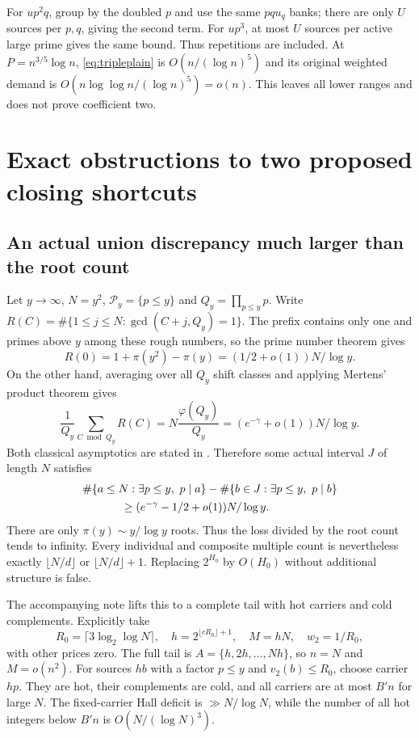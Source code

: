 \documentclass[11pt,a4paper]{article}
\begin{document}
For $up^2q$, group by the doubled $p$ and use the same $pqu_q$ banks;
there are only $U$ sources per $p,q$, giving the second term.
For $up^3$, at most $U$ sources per active large prime gives the same
bound. Thus repetitions are included. At $P=n^{3/5}\log n$,
\eqref{eq:tripleplain} is $O(n/(\log n)^5)$ and its original weighted
demand is $O(n\log\log n/(\log n)^5)=o(n)$.
This leaves all lower ranges and does not prove coefficient two.

\section{Exact obstructions to two proposed closing shortcuts}

\subsection{An actual union discrepancy much larger than the root count}
Let $y\to\infty$, $N=y^2$, $\mathcal P_y=\{p\le y\}$ and
$Q_y=\prod_{p\le y}p$. Write
$R(C)=\#\{1\le j\le N:\gcd(C+j,Q_y)=1\}$.
The prefix contains only one and primes above $y$ among these rough
numbers, so the prime number theorem gives
\[
 R(0)=1+\pi(y^2)-\pi(y)
      =(1/2+o(1))N/\log y.
\]
On the other hand, averaging over all $Q_y$ shift classes and applying
Mertens' product theorem gives
\[
 \frac1{Q_y}\sum_{C\bmod Q_y}R(C)
 =N\frac{\varphi(Q_y)}{Q_y}
 =(e^{-\gamma}+o(1))N/\log y.
\]
Both classical asymptotics are stated in \cite{Tao}. Therefore some
actual interval $J$ of length $N$ satisfies
\begin{equation}
 \begin{split}
 &\#\{a\le N:\exists p\le y,\ p\mid a\}
   -\#\{b\in J:\exists p\le y,\ p\mid b\}\\
 &\hspace{12mm}\ge(e^{-\gamma}-1/2+o(1))N/\log y.
 \end{split}                                                \label{eq:unioncounter}
\end{equation}
There are only $\pi(y)\sim y/\log y$ roots. Thus the loss divided
by the root count tends to infinity. Every individual and composite
multiple count is nevertheless exactly $\lfloor N/d\rfloor$ or
$\lfloor N/d\rfloor+1$. Replacing $2^{H_0}$ by $O(H_0)$ without
additional structure is false.

The accompanying note lifts this to a complete tail with hot carriers
and cold complements. Explicitly take
\[
 R_0=\lceil3\log_2\log N\rceil,\quad
 h=2^{\lfloor cR_0\rfloor+1},\quad M=hN,\quad
 w_2=1/R_0,
\]
with other prices zero. The full tail is $A=\{h,2h,\ldots,Nh\}$,
so $n=N$ and $M=o(n^2)$. For sources $hb$ with a factor $p\le y$
and $v_2(b)\le R_0$, choose carrier $hp$. They are hot, their
complements are cold, and all carriers are at most $B'n$ for large
$N$. The fixed-carrier Hall deficit is $\gg N/\log N$, while the
number of all hot integers below $B'n$ is $O(N/(\log N)^3)$.
\end{document}
